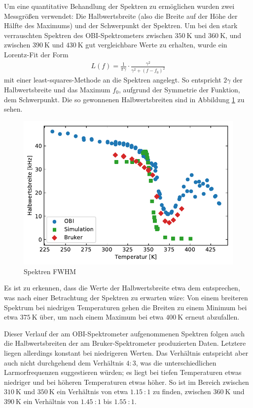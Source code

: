 Um eine quantitative Behandlung der Spektren zu ermöglichen wurden zwei Messgrößen verwendet: Die Halbwertsbreite (also die Breite auf der Höhe der Hälfte des Maximums) und der Schwerpunkt der Spektren. Um bei den stark verrauschten Spektren des OBI-Spektrometers zwischen $\SI{350}{\kelvin}$ und $\SI{360}{\kelvin}$, und zwischen $\SI{390}{\kelvin}$ und $\SI{430}{\kelvin}$ gut vergleichbare Werte zu erhalten, wurde ein Lorentz-Fit der Form
\begin{align}
	L(f) = \frac{1}{\pi \gamma} \cdot \frac{\gamma^2}{\gamma^2 + (f - f_0)^2} \label{eqn:res:lorentz}
\end{align}
mit einer least-squares-Methode an die Spektren angelegt. So entspricht $2 \gamma$ der Halbwertsbreite und das Maximum $f_0$, aufgrund der Symmetrie der Funktion, dem Schwerpunkt. Die so gewonnenen Halbwertsbreiten sind in Abbildung \ref{fig:res:spek_fwhm} zu sehen.
\begin{figure}
	\begin{center}
		\includegraphics[width=\textwidth]{graphics/plot/fwhm.pdf}
	\end{center}
	\caption{Spektren FWHM} \label{fig:res:spek_fwhm}
\end{figure}
Es ist zu erkennen, dass die Werte der Halbwertsbreite etwa dem entsprechen, was nach einer Betrachtung der Spektren zu erwarten wäre: Von einem breiteren Spektrum bei niedrigen Temperaturen gehen die Breiten zu einem Minimum bei etwa $\SI{375}{\kelvin}$ über, um nach einem Maximum bei etwa $\SI{400}{\kelvin}$ erneut abzufallen.

Dieser Verlauf der am OBI-Spektrometer aufgenommenen Spektren folgen auch die Halbwertsbreiten der am Bruker-Spektrometer produzierten Daten. Letztere liegen allerdings konstant bei niedrigeren Werten. Das Verhältnis entspricht aber auch nicht durchgehend dem Verhältnis $4:3$, was die unterschiedlichen Larmorfrequenzen suggestieren würden; es liegt bei tiefen Temperaturen etwas niedriger und bei höheren Temperaturen etwas höher. So ist im Bereich zwischen $\SI{310}{\kelvin}$ und $\SI{350}{\kelvin}$ ein Verhältnis von etwa $\SI{1.15}{}:1$ zu finden, zwischen $\SI{360}{\kelvin}$ und $\SI{390}{\kelvin}$ ein Verhältnis von $\SI{1.45}{}:1$ bis $\SI{1.55}{}:1$.

